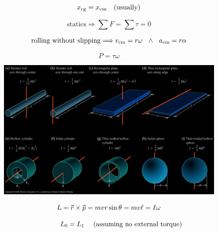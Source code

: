 \documentclass[12pt]{article}
\begin{document}
\begin{equation}
	x_{\textrm{cg}} = x_{\textrm{cm}} ~~~ (\textrm{usually})
\end{equation}

\begin{equation}
	\textrm{statics} \Longrightarrow \sum F = \sum \tau = 0
\end{equation}

\begin{equation}
	\textrm{rolling without slipping} \Longrightarrow v_{\textrm{cm}} = r \omega ~~ \land ~~ a_{\textrm{cm}} = r \alpha
\end{equation}

\begin{equation}
	P = \tau \omega
\end{equation}

\pagebreak
\restoregeometry

\begin{figure}[ht]
	\centering
	\includegraphics[width=\textwidth]{./rotational-inertia-table.png}
\end{figure}

 \begin{equation}
	L = \rvec \times \pvec = mvr \sin \theta = mv\ell = I \omega
\end{equation}

\begin{equation}
	\hpx{36} L_0 = L_1 ~~~~ (\textrm{assuming no external torque})
\end{equation}



\ifx \combinedDocuments \undefined
\end{document}
